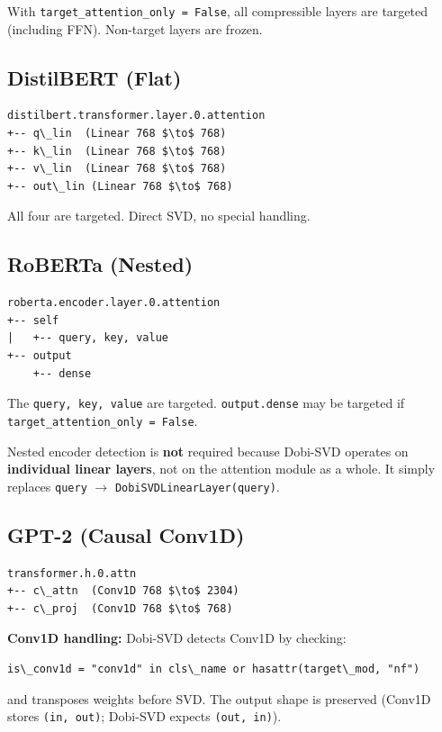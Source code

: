 With \texttt{target\_attention\_only = False}, all compressible layers are targeted 
(including FFN). Non-target layers are frozen.

\subsection{DistilBERT (Flat)}

\begin{lstlisting}
distilbert.transformer.layer.0.attention
+-- q\_lin  (Linear 768 $\to$ 768)
+-- k\_lin  (Linear 768 $\to$ 768)
+-- v\_lin  (Linear 768 $\to$ 768)
+-- out\_lin (Linear 768 $\to$ 768)
\end{lstlisting}

All four are targeted. Direct SVD, no special handling.

\subsection{RoBERTa (Nested)}

\begin{lstlisting}
roberta.encoder.layer.0.attention
+-- self
|   +-- query, key, value
+-- output
    +-- dense
\end{lstlisting}

The \texttt{query, key, value} are targeted. \texttt{output.dense} may be targeted if 
\texttt{target\_attention\_only = False}.

Nested encoder detection is \textbf{not} required because Dobi-SVD operates on 
\textbf{individual linear layers}, not on the attention module as a whole. It 
simply replaces \texttt{query} $\to$ \texttt{DobiSVDLinearLayer(query)}.

\subsection{GPT-2 (Causal Conv1D)}

\begin{lstlisting}
transformer.h.0.attn
+-- c\_attn  (Conv1D 768 $\to$ 2304)
+-- c\_proj  (Conv1D 768 $\to$ 768)
\end{lstlisting}

\textbf{Conv1D handling:} Dobi-SVD detects Conv1D by checking:

\begin{lstlisting}
is\_conv1d = "conv1d" in cls\_name or hasattr(target\_mod, "nf")
\end{lstlisting}

and transposes weights before SVD. The output shape is preserved 
(Conv1D stores \texttt{(in, out)}; Dobi-SVD expects \texttt{(out, in)}).

